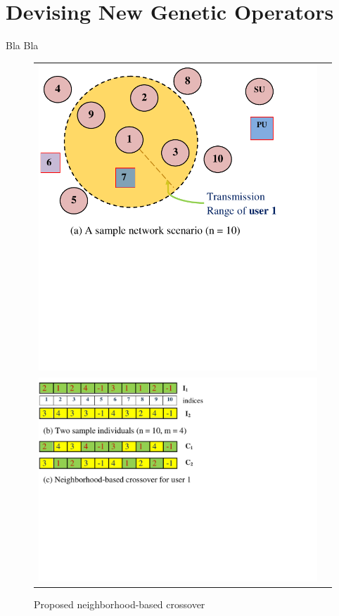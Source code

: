 \chapter{Devising New Genetic Operators}\label{sec:Nf}
Bla Bla

\begin{center}
\begin{figure}[!thb]

\begin{tabular}{ll}

		\hspace{43mm}
        \includegraphics [width=.5\textwidth]{figures/trans.pdf} \vspace{-40mm}
        \\
        \hspace{43mm}
		\includegraphics [width=.8\textwidth]{figures/neigh1.pdf}
      
\end{tabular}
\vspace{-45mm}
\caption{Proposed neighborhood-based crossover}\vspace{-10mm}
\label{fig:Neigh}
\vspace{-13mm}
\end{figure}
\end{center}
